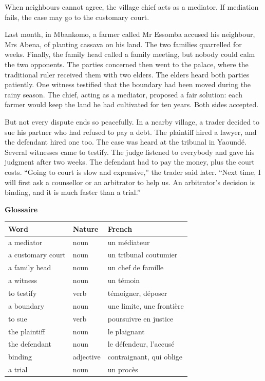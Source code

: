 \documentclass[11pt]{article}
\begin{document}
\begin{textebox}
When neighbours cannot agree, the village chief acts as a mediator. If mediation fails, the case may go to the customary court.

Last month, in Mbankomo, a farmer called Mr Essomba accused his neighbour, Mrs Abena, of planting cassava on his land. The two families quarrelled for weeks. Finally, the family head called a family meeting, but nobody could calm the two opponents. The parties concerned then went to the palace, where the traditional ruler received them with two elders. The elders heard both parties patiently. One witness testified that the boundary had been moved during the rainy season. The chief, acting as a mediator, proposed a fair solution: each farmer would keep the land he had cultivated for ten years. Both sides accepted.

But not every dispute ends so peacefully. In a nearby village, a trader decided to sue his partner who had refused to pay a debt. The plaintiff hired a lawyer, and the defendant hired one too. The case was heard at the tribunal in Yaoundé. Several witnesses came to testify. The judge listened to everybody and gave his judgment after two weeks. The defendant had to pay the money, plus the court costs. “Going to court is slow and expensive,” the trader said later. “Next time, I will first ask a counsellor or an arbitrator to help us. An arbitrator's decision is binding, and it is much faster than a trial.”
\end{textebox}

\textbf{Glossaire}\par

\begin{center}
\begin{tabularx}{\linewidth}{|l|l|X|}
\hline
\rowcolor{popblueL} \textbf{Word} & \textbf{Nature} & \textbf{French} \\
\hline
a mediator & noun & un médiateur \\
\hline
a customary court & noun & un tribunal coutumier \\
\hline
a family head & noun & un chef de famille \\
\hline
a witness & noun & un témoin \\
\hline
to testify & verb & témoigner, déposer \\
\hline
a boundary & noun & une limite, une frontière \\
\hline
to sue & verb & poursuivre en justice \\
\hline
the plaintiff & noun & le plaignant \\
\hline
the defendant & noun & le défendeur, l'accusé \\
\hline
binding & adjective & contraignant, qui oblige \\
\hline
a trial & noun & un procès \\
\hline
\end{tabularx}
\end{center}
\end{document}
